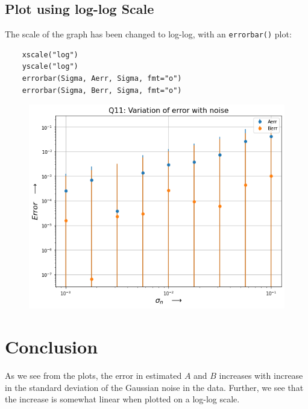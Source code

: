 \documentclass[12pt, a4paper]{article}
\begin{document}
\subsection{Plot using log-log Scale}
The scale of the graph has been changed to log-log, with an \texttt{errorbar()} plot:
\begin{verbatim}
    xscale("log")
    yscale("log")
    errorbar(Sigma, Aerr, Sigma, fmt="o")
    errorbar(Sigma, Berr, Sigma, fmt="o")
\end{verbatim}
\begin{figure}[H]
    \centering
    \includegraphics[scale=0.6]{Q11.png}
\end{figure}


\section{Conclusion}
As we see from the plots, the error in estimated $A$ and $B$ increases with increase in
the standard deviation of the Gaussian noise in the data. Further, we see that the
increase is somewhat linear when plotted on a log-log scale.
\end{document}
